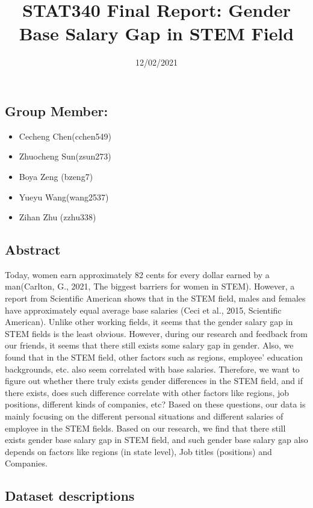 \documentclass[
]{article}
\title{STAT340 Final Report: Gender Base Salary Gap in STEM Field}
\author{}
\date{\vspace{-2.5em}12/02/2021}
\providecommand{\tightlist}{%
  \setlength{\itemsep}{0pt}\setlength{\parskip}{0pt}}
\begin{document}
\maketitle

\hypertarget{group-member}{%
\subsection{Group Member:}\label{group-member}}

\begin{itemize}
\tightlist
\item
  Cecheng Chen(cchen549)
\item
  Zhuocheng Sun(zsun273)
\item
  Boya Zeng (bzeng7)
\item
  Yueyu Wang(wang2537)
\item
  Zihan Zhu (zzhu338)
\end{itemize}

\hypertarget{abstract}{%
\subsection{Abstract}\label{abstract}}

Today, women earn approximately 82 cents for every dollar earned by a
man(Carlton, G., 2021, The biggest barriers for women in STEM). However,
a report from Scientific American shows that in the STEM field, males
and females have approximately equal average base salaries (Ceci et al.,
2015, Scientific American). Unlike other working fields, it seems that
the gender salary gap in STEM fields is the least obvious. However,
during our research and feedback from our friends, it seems that there
still exists some salary gap in gender. Also, we found that in the STEM
field, other factors such as regions, employee' education backgrounds,
etc. also seem correlated with base salaries. Therefore, we want to
figure out whether there truly exists gender differences in the STEM
field, and if there exists, does such difference correlate with other
factors like regions, job positions, different kinds of companies, etc?
Based on these questions, our data is mainly focusing on the different
personal situations and different salaries of employee in the STEM
fields. Based on our research, we find that there still exists gender
base salary gap in STEM field, and such gender base salary gap also
depends on factors like regions (in state level), Job titles (positions)
and Companies.

\hypertarget{dataset-descriptions}{%
\subsection{Dataset descriptions}\label{dataset-descriptions}}
\end{document}
